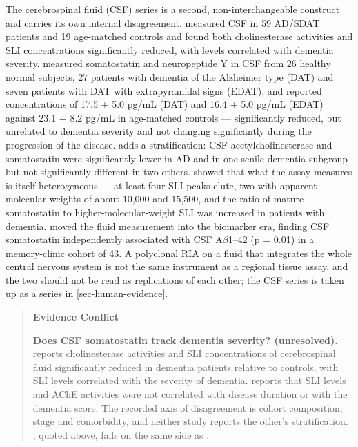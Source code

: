 \documentclass[11pt]{article}
\begin{document}
The cerebrospinal fluid (CSF) series is a second, non-interchangeable construct and carries its own internal disagreement. \citet{Soininen1984} measured CSF in 59 AD/SDAT patients and 19 age-matched controls and found both cholinesterase activities and SLI concentrations significantly reduced, with levels correlated with dementia severity. \citet{Atack1988} measured somatostatin and neuropeptide Y in CSF from 26 healthy normal subjects, 27 patients with dementia of the Alzheimer type (DAT) and seven patients with DAT with extrapyramidal signs (EDAT), and reported concentrations of 17.5 $\pm$ 5.0 pg/mL (DAT) and 16.4 $\pm$ 5.0 pg/mL (EDAT) against 23.1 $\pm$ 8.2 pg/mL in age-matched controls --- significantly reduced, but unrelated to dementia severity and not changing significantly during the progression of the disease. \citet{Urakami1989} adds a stratification: CSF acetylcholinesterase and somatostatin were significantly lower in AD and in one senile-dementia subgroup but not significantly different in two others. \citet{Cramer1985b} showed that what the assay measures is itself heterogeneous --- at least four SLI peaks elute, two with apparent molecular weights of about 10,000 and 15,500, and the ratio of mature somatostatin to higher-molecular-weight SLI was increased in patients with dementia. \citet{Duron2018} moved the fluid measurement into the biomarker era, finding CSF somatostatin independently associated with CSF A$\beta$1--42 (p = 0.01) in a memory-clinic cohort of 43. A polyclonal RIA on a fluid that integrates the whole central nervous system is not the same instrument as a regional tissue assay, and the two should not be read as replications of each other; the CSF series is taken up as a series in \ref{sec-human-evidence}.

\begin{quote}
\noindent\textbf{Evidence Conflict}\par
\textbf{Does CSF somatostatin track dementia severity? (unresolved).} \citet{Soininen1984} reports cholinesterase activities and SLI concentrations of cerebrospinal fluid significantly reduced in dementia patients relative to controls, with SLI levels correlated with the severity of dementia. \citet{Gomez1986b} reports that SLI levels and AChE activities were not correlated with disease duration or with the dementia score. The recorded axis of disagreement is cohort composition, stage and comorbidity, and neither study reports the other's stratification. \citet{Atack1988}, quoted above, falls on the same side as \citet{Gomez1986b}.

\end{quote}
\end{document}
